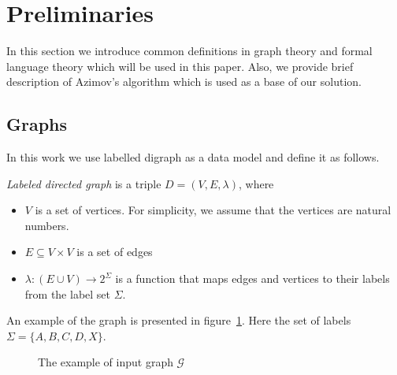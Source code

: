\section{Preliminaries}

In this section we introduce common definitions in graph theory and formal language theory which will be used in this paper. 
Also, we provide brief description of Azimov's algorithm which is used as a base of our solution.

\subsection{Graphs}

In this work we use labelled digraph as a data model and define it as follows.

\begin{definition} \emph{Labeled directed graph} is a triple $D = (V, E, \lambda)$, where
\begin{itemize}
    \item $V$ is a set of vertices. For simplicity, we assume that the vertices are natural numbers.
    \item $E \subseteq V \times V$ is a set of edges
    \item $\lambda : (E\cup V) \xrightarrow{} 2^\Sigma$ is a function that maps edges and vertices to their labels from the label set $\Sigma$.
\end{itemize}
\end{definition}

An example of the graph is presented in figure~\ref{fig:example_input_graph}. Here the set of labels $\Sigma = \{A, B, C, D, X\}$.

\begin{figure}[h]
    \centering        
    \caption{The example of input graph $\mathcal{G}$}
    \label{fig:example_input_graph}
\end{figure}

